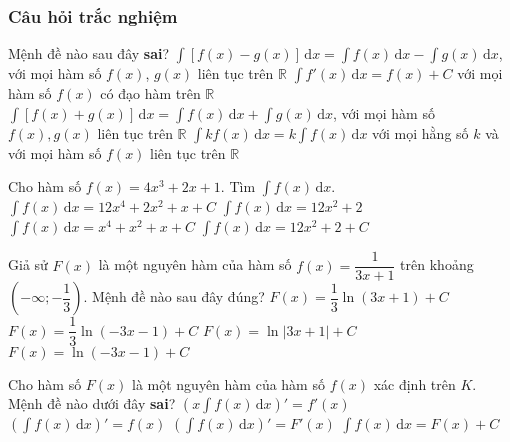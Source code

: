 \subsubsection{Câu hỏi trắc nghiệm}
\begin{ex}%
	Mệnh đề nào sau đây \textbf{sai}?
	\choice
	{$\displaystyle\int[f(x)-g(x)]\mathrm{\,d}x=\displaystyle\int f(x)\mathrm{\,d}x-\displaystyle\int g(x)\mathrm{\,d}x$, với mọi hàm số $f(x)$, $ g(x)$ liên tục trên $\mathbb{R}$}
	{$\displaystyle\int f'(x)\mathrm{\,d}x=f(x)+C$ với mọi hàm số $f(x)$ có đạo hàm trên $\mathbb{R}$}
	{$\displaystyle\int[f(x)+g(x)]\mathrm{\,d}x=\displaystyle\int f(x)\mathrm{\,d}x+\displaystyle\int g(x)\mathrm{\,d}x$, với mọi hàm số $f(x), g(x)$ liên tục trên $\mathbb{R}$}
	{\True $\displaystyle\int kf(x)\mathrm{\,d}x=k\displaystyle\int f(x)\mathrm{\,d}x$ với mọi hằng số $k$ và với mọi hàm số $f(x)$ liên tục trên $\mathbb{R}$}
\end{ex}
\begin{ex}%
	Cho hàm số $f(x)=4x^3+2x+1$. Tìm $\displaystyle\int f(x)\mathrm{\,d}x$. 
	\choice
	{$\displaystyle\int f(x)\mathrm{\,d}x=12x^4+2x^2+x+C$}
	{$\displaystyle\int f(x)\mathrm{\,d}x=12x^2+2$}
	{\True $\displaystyle\int f(x)\mathrm{\,d}x=x^4+x^2+x+C$}
	{$\displaystyle\int f(x)\mathrm{\,d}x=12x^2+2+C$}
\end{ex}
\begin{ex}%
	Giả sử $F(x)$ là một nguyên hàm của hàm số $f(x)=\dfrac{1}{3x+1}$ trên khoảng $\left(-\infty;-\dfrac{1}{3}\right)$. Mệnh đề nào sau đây đúng?
	\choice
	{$F(x)=\dfrac{1}{3}\ln(3x+1)+C$}
	{\True $F(x)=\dfrac{1}{3}\ln(-3x-1)+C$}
	{$F(x)=\ln|3x+1|+C$}
	{$F(x)=\ln(-3x-1)+C$}
\end{ex}
\begin{ex}%
	Cho hàm số $F(x)$ là một nguyên hàm của hàm số $f(x)$ xác định trên $K$. Mệnh đề nào dưới đây \textbf{sai}?
	\choice
	{\True $\left(x\displaystyle\int f(x)\mathrm{\,d}x\right)'=f'(x)$}
	{$\left(\displaystyle\int f(x)\mathrm{\,d}x\right)'=f(x)$}
	{$\left(\displaystyle\int f(x)\mathrm{\,d}x\right)'=F'(x)$}
	{$\displaystyle\int f(x)\mathrm{\,d}x=F(x)+C$}
\end{ex}
